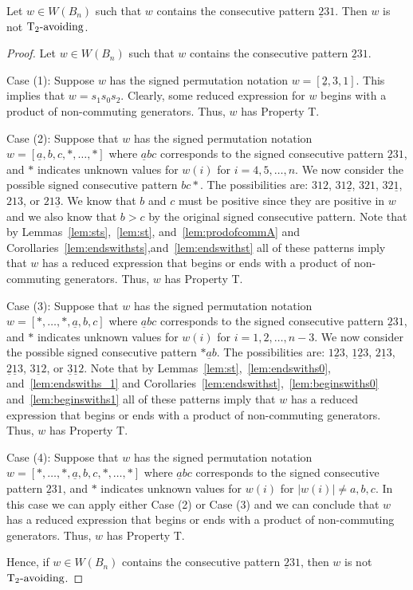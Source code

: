\begin{lemma}\label{lem:231}
Let $w \in W(B_n)$ such that $w$ contains the consecutive pattern $\underline{2}31$. Then $w$ is not $\operatorname{T_2-\mathrm{avoiding}}$.
\begin{proof}
	Let $w \in W(B_n)$ such that $w$ contains the consecutive pattern $\underline{2}31$.
	
	Case (1): Suppose $w$ has the signed permutation notation $w=[\underline{2},3,1]$. This implies that $w=s_1s_0s_2$. Clearly, some reduced expression for $w$ begins with a product of non-commuting generators. Thus, $w$ has Property T.
	
	Case (2): Suppose that $w$ has the signed permutation notation $w=[\underline{a},b,c, \ast, \ldots, \ast]$ where $\underline{a}bc$ corresponds to the signed consecutive pattern $\underline{2}31$, and $\ast$ indicates unknown values for $w(i)$ for $i=4,5, \ldots, n$. We now consider the possible signed consecutive pattern $bc \ast$. The possibilities are: $312$, $31\underline{2}$, $321$, $32\underline{1}$, $213$, or $21\underline{3}$. We know that $b$ and $c$ must be positive since they are positive in $w$ and we also know that $b>c$ by the original signed consecutive pattern. Note that by Lemmas~\ref{lem:sts},~\ref{lem:st}, and~\ref{lem:prodofcommA} and Corollaries~\ref{lem:endswithsts},and~\ref{lem:endswithst} all of these patterns imply that $w$ has a reduced expression that begins or ends with a product of non-commuting generators. Thus, $w$ has Property T.
	
	Case (3): Suppose that $w$ has the signed permutation notation $w=[\ast, \ldots, \ast, \underline{a},b,c]$ where $\underline{a}bc$ corresponds to the signed consecutive pattern $\underline{2}31$, and $\ast$ indicates unknown values for $w(i)$ for $i=1,2, \ldots ,n-3$. We now consider the possible signed consecutive pattern $\ast \underline{a}b$. The possibilities are: $1 \underline{2} 3$, $\underline{1} \underline{2}3$, $2 \underline{1} 3$, $\underline{2} \underline{1} 3$, $3 \underline{1} 2$, or $\underline{3} \underline{1} 2$. Note that by Lemmas~\ref{lem:st},~\ref{lem:endswiths0}, and~\ref{lem:endswiths_1} and Corollaries~\ref{lem:endswithst},~\ref{lem:beginswiths0} and~\ref{lem:beginswiths1} all of these patterns imply that $w$ has a reduced expression that begins or ends with a product of non-commuting generators. Thus, $w$ has Property T. 
	
	Case (4): Suppose that $w$ has the signed permutation notation $w=[\ast, \ldots, \ast, \underline{a},b,c, \ast, \ldots, \ast]$ where $\underline{a}bc$ corresponds to the signed consecutive pattern $\underline{2}31$, and $\ast$ indicates unknown values for $w(i)$ for $|w(i)|\neq a,b,c$. In this case we can apply either Case (2) or Case (3) and we can conclude that $w$ has a reduced expression that begins or ends with a product of non-commuting generators. Thus, $w$ has Property T.

	Hence, if $w \in W(B_n)$ contains the consecutive pattern $\underline{2}31$, then $w$ is not $\operatorname{T_2-\mathrm{avoiding}}$.
\end{proof}	
\end{lemma}


